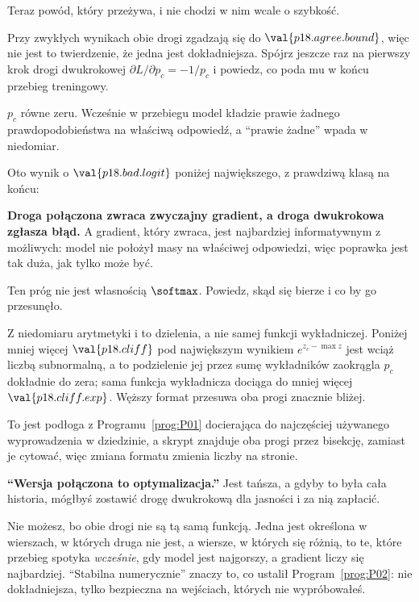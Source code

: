 \begin{fr}
Teraz powód, który przeżywa, i nie chodzi w nim wcale o szybkość.

Przy zwykłych wynikach obie drogi zgadzają się do $\val{p18.agree.bound}$,
więc nie jest to twierdzenie, że jedna jest dokładniejsza. Spójrz jeszcze raz
na pierwszy krok drogi dwukrokowej \dash{} $\partial L/\partial p_c = -1/p_c$
\dash{} i powiedz, co poda mu w końcu przebieg treningowy.
\dotline
\nextframe
\end{fr}

\begin{fr}
\begin{ansblock}
$p_c$ równe zeru. Wcześnie w przebiegu model kładzie prawie żadnego
prawdopodobieństwa na właściwą odpowiedź, a \enquote{prawie żadne} wpada w
niedomiar.
\end{ansblock}

Oto wynik o $\val{p18.bad.logit}$ poniżej największego, z prawdziwą klasą na
końcu:


\textbf{Droga połączona zwraca zwyczajny gradient, a droga dwukrokowa zgłasza
błąd.} A gradient, który zwraca, jest najbardziej informatywnym z możliwych:
model nie położył masy na właściwej odpowiedzi, więc poprawka jest tak duża,
jak tylko może być.
\end{fr}

\begin{fr}
Ten próg nie jest własnością $\softmax$. Powiedz, skąd się bierze i co by go
przesunęło.
\nextframe
\end{fr}

\begin{fr}
\begin{ansblock}
Z niedomiaru arytmetyki \dash{} i to dzielenia, a nie samej funkcji
wykładniczej. Poniżej mniej więcej $\val{p18.cliff}$ pod największym wynikiem
$e^{z_c - \max z}$ jest wciąż liczbą subnormalną, a to podzielenie jej przez
sumę wykładników zaokrągla $p_c$ dokładnie do zera; sama funkcja wykładnicza
dociąga do mniej więcej $\val{p18.cliff.exp}$. Węższy format przesuwa oba
progi znacznie bliżej.
\end{ansblock}

To jest podłoga z Programu~\ref{prog:P01} docierająca do najczęściej
używanego wyprowadzenia w dziedzinie, a skrypt znajduje oba progi przez
bisekcję, zamiast je cytować, więc zmiana formatu zmienia liczby na stronie.

\begin{trapbox}
\textbf{\enquote{Wersja połączona to optymalizacja.}} Jest tańsza, a gdyby to
była cała historia, mógłbyś zostawić drogę dwukrokową dla jasności i za nią
zapłacić.

Nie możesz, bo obie drogi nie są tą samą funkcją. Jedna jest określona w
wierszach, w których druga nie jest, a wiersze, w których się różnią, to te,
które przebieg spotyka \emph{wcześnie}, gdy model jest najgorszy, a gradient
liczy się najbardziej. \enquote{Stabilna numerycznie} znaczy to, co ustalił
Program~\ref{prog:P02}: nie dokładniejsza, tylko bezpieczna na wejściach,
których nie wypróbowałeś.
\end{trapbox}
\end{fr}


